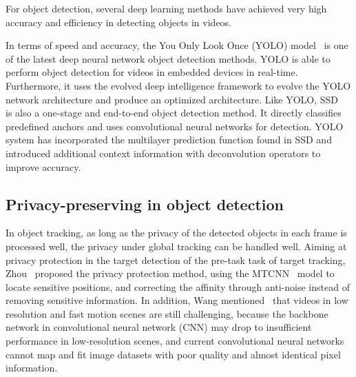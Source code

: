 \documentclass[trans]{IEEEtran}
\begin{document}
For object detection, several deep learning methods have achieved very high accuracy and efficiency in detecting objects in videos. 

In terms of speed and accuracy, the You Only Look Once (YOLO) model~\cite{farhadi2018yolov3,redmon2016you} is one of the latest deep neural network object detection methods. 
YOLO is able to perform object detection for videos in embedded devices in real-time. Furthermore, it uses the evolved deep intelligence framework to evolve the YOLO network architecture and produce an optimized architecture.
Like YOLO, SSD~\cite{liu2016ssd} is also a one-stage and end-to-end object detection method. 
It directly classifies predefined anchors and uses convolutional neural networks for detection. 
YOLO~\cite{farhadi2018yolov3} system has incorporated the multilayer prediction function found in SSD and introduced additional context information with deconvolution operators to improve accuracy.

\subsection{Privacy-preserving in object detection}
In object tracking, as long as the privacy of the detected objects in each frame is processed well, the privacy under global tracking can be handled well. Aiming at privacy protection in the target detection of the pre-task task of target tracking, Zhou~\cite{zhou2020personal} proposed the privacy protection method, using the MTCNN~\cite{zhang2016joint} model to locate sensitive positions, and correcting the affinity through anti-noise instead of removing sensitive information. In addition, Wang mentioned~\cite{wang2021dynamic} that videos in low resolution and fast motion scenes are still challenging, because the backbone network in convolutional neural network (CNN) may drop to insufficient performance in low-resolution scenes, and current convolutional neural networks cannot map and fit image datasets with poor quality and almost identical pixel information.
\end{document}
